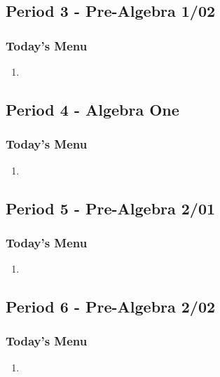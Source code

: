   \subsection[PA1/02]{Period 3 - Pre-Algebra 1/02}
	 \begin{frame}[label=PA1_02]
	 	\frametitle{Today's Menu}
	 
         \begin{enumerate}
   	   	   \item
   	   	   \rightarrowitem
   	     \end{enumerate}	 
	 
	  \end{frame}
	 
 \subsection[ALG]{Period 4 - Algebra One}
 \begin{frame}[label=ALG1]
 	\frametitle{Today's Menu}

        \begin{enumerate}
   	   	   \item
   	   	   \rightarrowitem
   	     \end{enumerate}  	
  	
 	 	\end{frame}	 
 	
 	
 \subsection[PA2/01]{Period 5 - Pre-Algebra 2/01}
   \begin{frame}[label=PA2_01]
 	\frametitle{Today's Menu}
 	
        \begin{enumerate}
   	   	   \item
   	   	   \rightarrowitem
   	     \end{enumerate} 	
 	
 	\end{frame}	 
      
  \subsection[PA2/02]{Period 6 - Pre-Algebra 2/02}
  \begin{frame}[label=PA2_02]
  	\frametitle{Today's Menu}

       \begin{enumerate}
   	   	   \item
   	   	   \rightarrowitem
   	     \end{enumerate}  	 
  	 
    \end{frame}
	  
